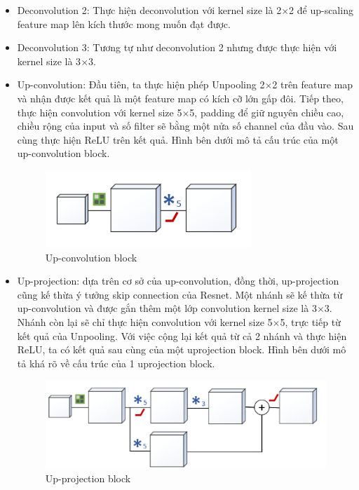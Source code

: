 \begin{itemize}
	\item Deconvolution 2: Thực hiện deconvolution với kernel size là 2$\times$2 để up-scaling feature map lên kích thước mong muốn đạt được.
	\item Deconvolution 3: Tương tự như deconvolution 2 nhưng được thực hiện với kernel size là 3$\times$3. 
	\item Up-convolution: Đầu tiên, ta thực hiện phép Unpooling 2$\times$2 trên feature map và nhận được kết quả là một feature map có kích cỡ lớn gấp đôi. Tiếp theo, thực hiện convolution với kernel size 5$\times$5, padding để giữ nguyên chiều cao, chiều rộng của input và số filter sẽ bằng một nửa số channel của đầu vào. Sau cùng thực hiện ReLU trên kết quả.  Hình bên dưới mô tả cấu trúc của một up-convolution block. 
      \begin{center}
         \begin{figure}[H]
         \begin{center}
           \includegraphics[scale=0.6]{image/up_conv}
          \end{center}
          \caption{Up-convolution block}
          \label{ref_sigmoid}
          \end{figure}
      \end{center}
    
    \item Up-projection: dựa trên cơ sở của up-convolution, đồng thời, up-projection cũng kế thừa ý tưởng skip connection của Resnet. Một nhánh sẽ kế thừa từ up-convolution và được gắn thêm một lớp convolution kernel size là 3$\times$3. Nhánh còn lại sẽ chỉ thực hiện convolution với kernel size 5$\times$5, trực tiếp từ kết quả của Unpooling. Với việc cộng lại kết quả từ cả 2 nhánh và thực hiện ReLU, ta có kết quả sau cùng của một uprojection block. Hình bên dưới mô tả khá rõ về cấu trúc của 1 uprojection block.
    
     \begin{center}
         \begin{figure}[H]
         \begin{center}
           \includegraphics[scale=0.7]{image/up_projection}
          \end{center}
          \caption{Up-projection block}
          \label{ref_sigmoid}
          \end{figure}
      \end{center}
 \end{itemize}


